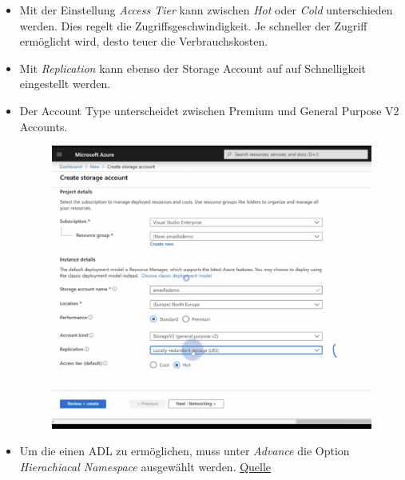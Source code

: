 \begin{itemize}
	\item Mit der Einstellung \textit{Access Tier} kann zwischen \textit{Hot} oder \textit{Cold} unterschieden werden. Dies regelt die Zugriffsgeschwindigkeit. Je schneller der Zugriff ermöglicht wird, desto teuer die Verbrauchskosten.
	\item Mit \textit{Replication} kann ebenso der Storage Account auf auf Schnelligkeit eingestellt werden.
	\item Der Account Type unterscheidet zwischen Premium und General Purpose V2 Accounts.
	\begin{figure}[H]
	\centering
	\includegraphics[scale = 0.4]{attachment/chapter_2/Scc112}
\end{figure}
	\item Um die einen \gls{ADL} zu ermöglichen, muss unter \textit{Advance} die Option \textit{Hierachiacal Namespace} ausgewählt werden. 
	\href{https://learn.microsoft.com/en-us/azure/storage/common/storage-account-create?toc=%2Fazure%2Fstorage%2Fblobs%2Ftoc.json&tabs=azure-portal}{Quelle}


\end{itemize}
